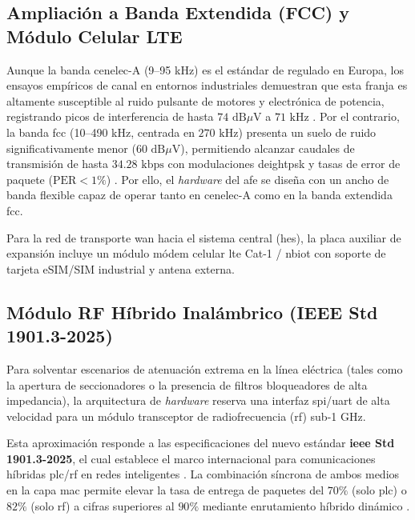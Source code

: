 \subsection{Ampliación a Banda Extendida (FCC) y Módulo Celular LTE}
\label{subsec:banda_fcc_lte}

Aunque la banda \gls{cenelec}-A (9--95 kHz) es el estándar de  regulado en Europa, los ensayos empíricos de canal en entornos industriales demuestran que esta franja es altamente susceptible al ruido pulsante de motores y electrónica de potencia, registrando picos de interferencia de hasta $74\text{ dB}\mu\text{V}$ a $71\text{ kHz}$ \cite{7390450}. Por el contrario, la banda \gls{fcc} (10--490 kHz, centrada en $270\text{ kHz}$) presenta un suelo de ruido significativamente menor ($60\text{ dB}\mu\text{V}$), permitiendo alcanzar caudales de transmisión de hasta $34.28\text{ kbps}$ con modulaciones \gls{deightpsk} y tasas de error de paquete ($\text{PER} < 1\%$) \cite{7390450}. Por ello, el \textit{hardware} del \gls{afe} se diseña con un ancho de banda flexible capaz de operar tanto en \gls{cenelec}-A como en la banda extendida \gls{fcc}.

Para la red de transporte \gls{wan} hacia el sistema central (\gls{hes}), la placa auxiliar de expansión incluye un módulo módem celular \gls{lte} Cat-1 / \gls{nbiot} con soporte de tarjeta eSIM/SIM industrial y antena externa.

\subsection{Módulo RF Híbrido Inalámbrico (IEEE Std 1901.3-2025)}
\label{subsec:rf_hibrido}

Para solventar escenarios de atenuación extrema en la línea eléctrica (tales como la apertura de seccionadores o la presencia de filtros bloqueadores de alta impedancia), la arquitectura de \textit{hardware} reserva una interfaz \gls{spi}/\gls{uart} de alta velocidad para un módulo transceptor de radiofrecuencia (\gls{rf}) sub-1 GHz.

Esta aproximación responde a las especificaciones del nuevo estándar \textbf{\gls{ieee} Std 1901.3-2025}, el cual establece el marco internacional para comunicaciones híbridas \gls{plc}/\gls{rf} en redes inteligentes \cite{11267209}. La combinación síncrona de ambos medios en la capa \gls{mac} permite elevar la tasa de entrega de paquetes del $70\%$ (solo \gls{plc}) o $82\%$ (solo \gls{rf}) a cifras superiores al \textbf{$90\%$} mediante enrutamiento híbrido dinámico \cite{7390450}.


